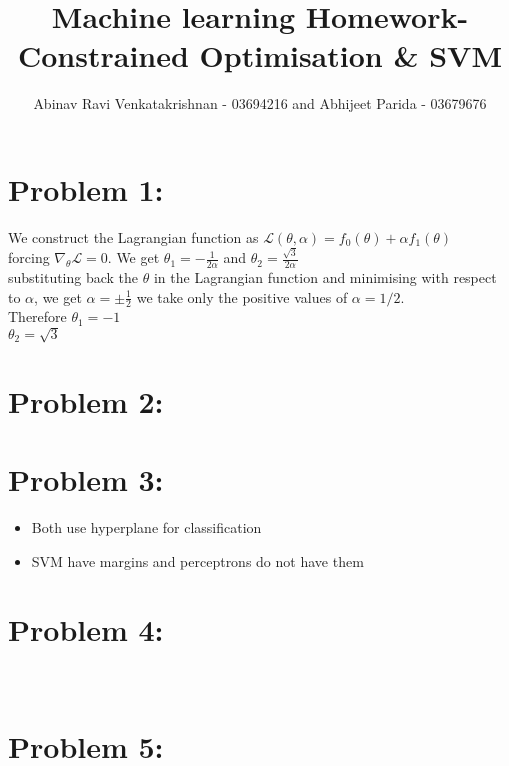\documentclass[5pt,a4paper]{article}
\begin{document}
	\title{Machine learning Homework- Constrained Optimisation \& SVM }
	\author{Abinav Ravi Venkatakrishnan - 03694216 and Abhijeet Parida - 03679676}
	\maketitle
	\section*{Problem 1:}
	We construct the Lagrangian function as
	$\mathcal{L}(\theta, \alpha)=f_0(\theta)+\alpha f_1(\theta)$\\
	forcing $\nabla_\theta \mathcal{L}=0$. We get $\theta_1=-\frac{1}{2\alpha}$ and $\theta_2=\frac{\sqrt{3}}{2\alpha}$\\
	substituting back the $\theta$ in the Lagrangian function and minimising with respect to $\alpha$, we get $\alpha=\pm \frac{1}{2}$ we take only the positive values of $\alpha=1/2$.\\
	Therefore $\theta_1=-1$\\
	$\theta_2=\sqrt{3}$
	
	\section*{Problem 2:}
	
	
	\section*{Problem 3:}
	\begin{itemize}
		\item Both use hyperplane for classification
		\item SVM have margins and perceptrons do not have them
	\end{itemize}
	
	\section*{Problem 4:}
	\\
	\section*{Problem 5:}
	
\end{document}
